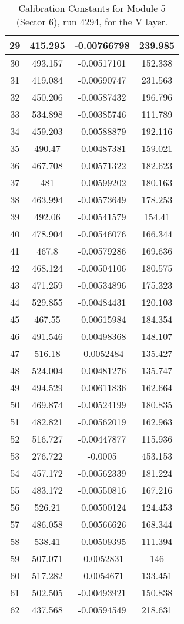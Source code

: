\begin{table}[h]
{\begin{tabular}{|c|c|c|c|}
29	&	415.295	&	-0.00766798	&	239.985	\\	\hline
30	&	493.157	&	-0.00517101	&	152.338	\\	\hline
31	&	419.084	&	-0.00690747	&	231.563	\\	\hline
32	&	450.206	&	-0.00587432	&	196.796	\\	\hline
33	&	534.898	&	-0.00385746	&	111.789	\\	\hline
34	&	459.203	&	-0.00588879	&	192.116	\\	\hline
35	&	490.47	&	-0.00487381	&	159.021	\\	\hline
36	&	467.708	&	-0.00571322	&	182.623	\\	\hline
37	&	481	&	-0.00599202	&	180.163	\\	\hline
38	&	463.994	&	-0.00573649	&	178.253	\\	\hline
39	&	492.06	&	-0.00541579	&	154.41	\\	\hline
40	&	478.904	&	-0.00546076	&	166.344	\\	\hline
41	&	467.8	&	-0.00579286	&	169.636	\\	\hline
42	&	468.124	&	-0.00504106	&	180.575	\\	\hline
43	&	471.259	&	-0.00534896	&	175.323	\\	\hline
44	&	529.855	&	-0.00484431	&	120.103	\\	\hline
45	&	467.55	&	-0.00615984	&	184.354	\\	\hline
46	&	491.546	&	-0.00498368	&	148.107	\\	\hline
47	&	516.18	&	-0.0052484	&	135.427	\\	\hline
48	&	524.004	&	-0.00481276	&	135.747	\\	\hline
49	&	494.529	&	-0.00611836	&	162.664	\\	\hline
50	&	469.874	&	-0.00524199	&	180.835	\\	\hline
51	&	482.821	&	-0.00562019	&	162.963	\\	\hline
52	&	516.727	&	-0.00447877	&	115.936	\\	\hline
53	&	276.722	&	-0.0005	&	453.153	\\	\hline
54	&	457.172	&	-0.00562339	&	181.224	\\	\hline
55	&	483.172	&	-0.00550816	&	167.216	\\	\hline
56	&	526.21	&	-0.00500124	&	124.453	\\	\hline
57	&	486.058	&	-0.00566626	&	168.344	\\	\hline
58	&	538.41	&	-0.00509395	&	111.394	\\	\hline
59	&	507.071	&	-0.0052831	&	146	\\	\hline
60	&	517.282	&	-0.0054671	&	133.451	\\	\hline
61	&	502.505	&	-0.00493921	&	150.838	\\	\hline
62	&	437.568	&	-0.00594549	&	218.631	\\	\hline
            \end{tabular}
        }
        \caption{Calibration Constants for Module 5 (Sector 6), run 4294, for the V layer.}
\end{table}


